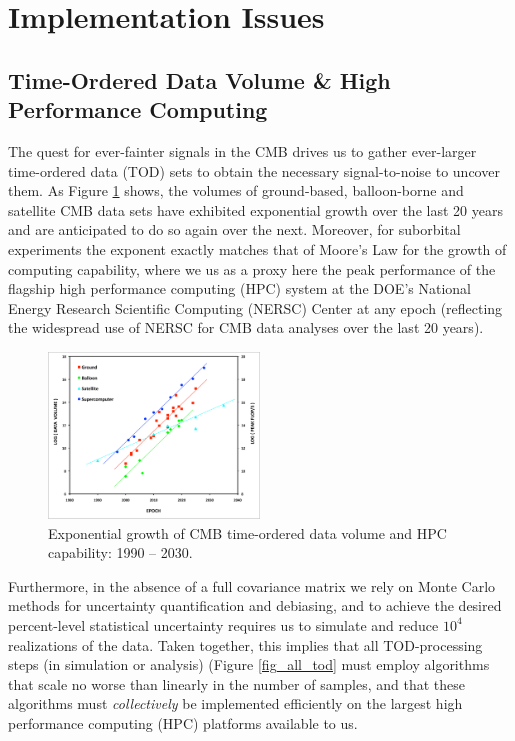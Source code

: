  
\section{Implementation Issues}

\subsection{Time-Ordered Data Volume \& High Performance Computing}

The quest for ever-fainter signals in the CMB drives us to gather ever-larger time-ordered data (TOD) sets to obtain the necessary signal-to-noise to uncover them. As Figure \ref{fig_cmb_hpc_scaling} shows, the volumes of ground-based, balloon-borne and satellite CMB data sets have exhibited exponential growth over the last 20 years and are anticipated to do so again over the next. Moreover, for suborbital experiments the exponent exactly matches that of Moore's Law for the growth of computing capability, where we us as a proxy here the peak performance of the flagship high performance computing (HPC) system at the DOE's National Energy Research Scientific Computing (NERSC) Center at any epoch (reflecting the widespread use of NERSC for CMB data analyses over the last 20 years). 

\begin{figure}[htbp]
\centering
\includegraphics[width=0.5\textwidth]{Analysis/cmb_hpc_scaling}
\caption{Exponential growth of CMB time-ordered data volume and HPC capability: 1990 -- 2030.}
\label{fig_cmb_hpc_scaling}
\end{figure}

Furthermore, in the absence of a full covariance matrix we rely on Monte Carlo methods for uncertainty quantification and debiasing, and to achieve the desired percent-level statistical uncertainty requires us to simulate and reduce $10^4$ realizations of the data. Taken together, this implies that all TOD-processing steps (in simulation or analysis) (Figure \ref{fig_all_tod} must employ algorithms that scale no worse than linearly in the number of samples, and that these algorithms must {\em collectively} be implemented efficiently on the largest high performance computing (HPC) platforms available to us. 

